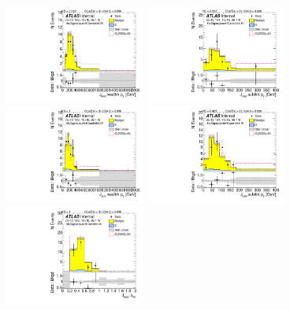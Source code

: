 \begin{figure}[htb!]
\begin{center}
\includegraphics[width=0.41\textwidth,angle=-90]{figures/boosted/Signal/b77_FourTag_Signal_leadHCand_trk0_Pt.pdf}
\includegraphics[width=0.41\textwidth,angle=-90]{figures/boosted/Signal/b77_FourTag_Signal_leadHCand_trk1_Pt.pdf}\\
\includegraphics[width=0.41\textwidth,angle=-90]{figures/boosted/Signal/b77_FourTag_Signal_sublHCand_trk0_Pt.pdf}
\includegraphics[width=0.41\textwidth,angle=-90]{figures/boosted/Signal/b77_FourTag_Signal_sublHCand_trk1_Pt.pdf}\\
\includegraphics[width=0.41\textwidth,angle=-90]{figures/boosted/Signal/b77_FourTag_Signal_leadHCand_trk_dr.pdf}

\end{center}
\end{figure}
